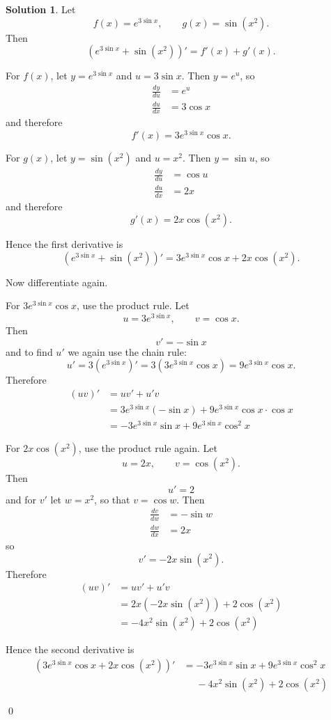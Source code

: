 \documentclass[a4paper]{article}
\theoremstyle{plain}
\theoremstyle{definition}
\newtheorem*{solution}{Solution}
\numberwithin{equation}{subsection}
\begin{document}
\begin{solution}

Let
\[
    f(x) = e^{3\sin x}, \qquad g(x) = \sin(x^2).
\]
Then
\[
    \left(e^{3\sin x} + \sin(x^2)\right)' = f'(x) + g'(x).
\]

For $f(x)$, let $y = e^{3\sin x}$ and $u = 3\sin x$. Then $y = e^u$, so
\begin{align*}
    \frac{dy}{du} &= e^u\\
    \frac{du}{dx} &= 3\cos x
\end{align*}
and therefore
\[
    f'(x) = 3e^{3\sin x}\cos x.
\]

For $g(x)$, let $y = \sin(x^2)$ and $u = x^2$. Then $y = \sin u$, so
\begin{align*}
    \frac{dy}{du} &= \cos u\\
    \frac{du}{dx} &= 2x
\end{align*}
and therefore
\[
    g'(x) = 2x\cos(x^2).
\]

Hence the first derivative is
\[
    \left(e^{3\sin x} + \sin(x^2)\right)' = 3e^{3\sin x}\cos x + 2x\cos(x^2).
\]

Now differentiate again.

For $3e^{3\sin x}\cos x$, use the product rule. Let
\[
    u = 3e^{3\sin x}, \qquad v = \cos x.
\]
Then
\[
    v' = -\sin x
\]
and to find $u'$ we again use the chain rule:
\[
    u' = 3\left(e^{3\sin x}\right)' = 3\left(3e^{3\sin x}\cos x\right) = 9e^{3\sin x}\cos x.
\]
Therefore
\begin{align*}
    (uv)' &= uv' + u'v\\
    &= 3e^{3\sin x}(-\sin x) + 9e^{3\sin x}\cos x \cdot \cos x\\
    &= -3e^{3\sin x}\sin x + 9e^{3\sin x}\cos^2 x
\end{align*}

For $2x\cos(x^2)$, use the product rule again. Let
\[
    u = 2x, \qquad v = \cos(x^2).
\]
Then
\[
    u' = 2
\]
and for $v'$ let $w = x^2$, so that $v = \cos w$. Then
\begin{align*}
    \frac{dv}{dw} &= -\sin w\\
    \frac{dw}{dx} &= 2x
\end{align*}
so
\[
    v' = -2x\sin(x^2).
\]
Therefore
\begin{align*}
    (uv)' &= uv' + u'v\\
    &= 2x(-2x\sin(x^2)) + 2\cos(x^2)\\
    &= -4x^2\sin(x^2) + 2\cos(x^2)
\end{align*}

Hence the second derivative is
\begin{align*}
    \left(3e^{3\sin x}\cos x + 2x\cos(x^2)\right)'
    &= -3e^{3\sin x}\sin x + 9e^{3\sin x}\cos^2 x \\
    &\phantom{=} -4x^2\sin(x^2) + 2\cos(x^2)
\end{align*}

\qed
\end{solution}
\end{document}
